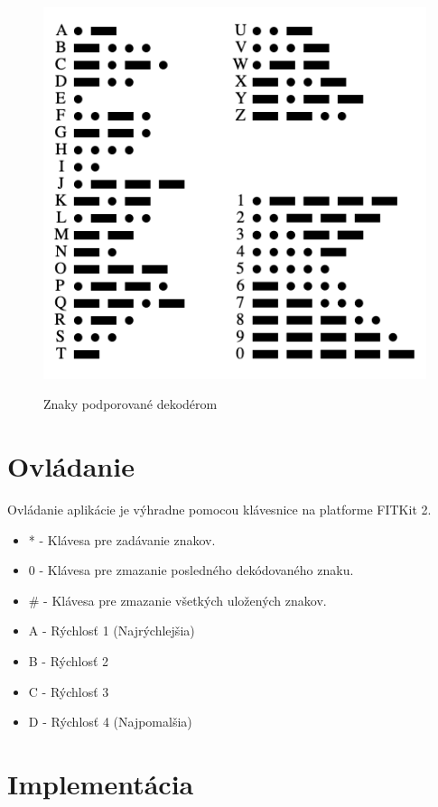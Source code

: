 \documentclass{article}
\begin{document}
	\begin{figure}[h]
		\centering
		\includegraphics[scale=0.6]{images/supported-signs.png} \\
		\caption{Znaky podporované dekodérom}
	\end{figure}
	
	\section{Ovládanie}
	Ovládanie aplikácie je výhradne pomocou klávesnice na platforme FITKit 2.
	\begin{itemize}
	    \item * - Klávesa pre zadávanie znakov.
	    \item 0 - Klávesa pre zmazanie posledného dekódovaného znaku.
	    \item \# - Klávesa pre zmazanie všetkých uložených znakov.
	    \item A - Rýchlosť 1 (Najrýchlejšia)
	    \item B - Rýchlosť 2
	    \item C - Rýchlosť 3
	    \item D - Rýchlosť 4 (Najpomalšia)
	\end{itemize}
	
	\section{Implementácia}
\end{document}
